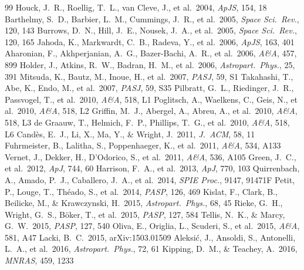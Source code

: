 \documentclass[twocolumn,10pt]{article}
\begin{document}
\begin{thebibliography}{99}
 Houck, J.~R., Roellig, T.~L., van Cleve, J., et al.\ 2004, \textit{ApJS}, 154, 18
 Barthelmy, S.~D., Barbier, L.~M., Cummings, J.~R., et al.\ 2005, \textit{Space Sci.\ Rev.}, 120, 143
 Burrows, D.~N., Hill, J.~E., Nousek, J.~A., et al.\ 2005, \textit{Space Sci.\ Rev.}, 120, 165
 Jahoda, K., Markwardt, C.~B., Radeva, Y., et al.\ 2006, \textit{ApJS}, 163, 401
 Aharonian, F., Akhperjanian, A.~G., Bazer-Bachi, A.~R., et al.\ 2006, \textit{A\&A}, 457, 899
 Holder, J., Atkins, R.~W., Badran, H.~M., et al.\ 2006, \textit{Astropart.\ Phys.}, 25, 391
 Mitsuda, K., Bautz, M., Inoue, H., et al.\ 2007, \textit{PASJ}, 59, S1
 Takahashi, T., Abe, K., Endo, M., et al.\ 2007, \textit{PASJ}, 59, S35
 Pilbratt, G.~L., Riedinger, J.~R., Passvogel, T., et al.\ 2010, \textit{A\&A}, 518, L1
 Poglitsch, A., Waelkens, C., Geis, N., et al.\ 2010, \textit{A\&A}, 518, L2
 Griffin, M.~J., Abergel, A., Abreu, A., et al.\ 2010, \textit{A\&A}, 518, L3
 de Graauw, T., Helmich, F.~P., Phillips, T.~G., et al.\ 2010, \textit{A\&A}, 518, L6
 Cand\`{e}s, E.~J., Li, X., Ma, Y., \& Wright, J.\ 2011, \textit{J.\ ACM}, 58, 11
 Fuhrmeister, B., Lalitha, S., Poppenhaeger, K., et al.\ 2011, \textit{A\&A}, 534, A133
 Vernet, J., Dekker, H., D'Odorico, S., et al.\ 2011, \textit{A\&A}, 536, A105
 Green, J.~C., et al.\ 2012, \textit{ApJ}, 744, 60
 Harrison, F.~A., et al.\ 2013, \textit{ApJ}, 770, 103
 Quirrenbach, A., Amado, P.~J., Caballero, J.~A., et al.\ 2014, \textit{SPIE Proc.}, 9147, 91471F
 Petit, P., Louge, T., Th\'{e}ado, S., et al.\ 2014, \textit{PASP}, 126, 469
 Kislat, F., Clark, B., Beilicke, M., \& Krawczynski, H.\ 2015, \textit{Astropart.\ Phys.}, 68, 45
 Rieke, G.~H., Wright, G.~S., B\"{o}ker, T., et al.\ 2015, \textit{PASP}, 127, 584
 Tellis, N.~K., \& Marcy, G.~W.\ 2015, \textit{PASP}, 127, 540
 Oliva, E., Origlia, L., Scuderi, S., et al.\ 2015, \textit{A\&A}, 581, A47
 Lacki, B.~C.\ 2015, arXiv:1503.01509
 Aleksi\'{c}, J., Ansoldi, S., Antonelli, L.~A., et al.\ 2016, \textit{Astropart.\ Phys.}, 72, 61
 Kipping, D.~M., \& Teachey, A.\ 2016, \textit{MNRAS}, 459, 1233

\end{thebibliography}
\end{document}
